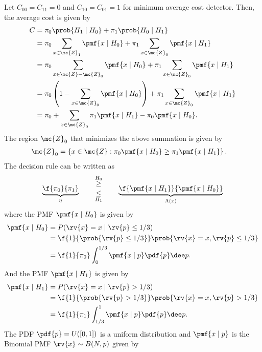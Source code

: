 \begin{example}
    Let $C_{00}=C_{11}=0$ and $C_{10}=C_{01}=1$ for minimum average cost detector. Then, the average cost is given by
    \begin{align}
        C 
        &= \pi_{0}\prob{H_{1}\mid H_{0}} + \pi_{1}\prob{H_{0}\mid H_{1}}\\
        &= \pi_{0}\sum_{x\in\mc{Z}_{1}} \pmf{x\mid H_{0}} + \pi_{1}\sum_{x\in\mc{Z}_{0}}\pmf{x\mid H_{1}}\\
        &= \pi_{0}\sum_{x\in \mc{Z} -  \mc{Z}_{0}} \pmf{x\mid H_{0}} + \pi_{1}\sum_{x\in \mc{Z}_{0}}\pmf{x\mid H_{1}}\\
        &= \pi_{0}\left(1 - \sum_{x\in\mc{Z}_{0}} \pmf{x\mid H_{0}}\right) + \pi_{1}\sum_{x\in \mc{Z}_{0}}\pmf{x\mid H_{1}}\\
        &= \pi_0 + \sum_{x\in\mc{Z}_{0}}\pi_{1}\pmf{x\mid H_{1}} - \pi_{0}\pmf{x\mid H_{0}}.
    \end{align}
    The region $\mc{Z}_{0}$ that minimizes the above summation is given by
    \begin{align}
        \mc{Z}_{0} &= \left\{ 
            x\in\mc{Z} : \pi_{0}\pmf{x\mid H_{0}} \geq \pi_{1}\pmf{x\mid H_{1}}
        \right\}.
    \end{align}
    The decision rule can be written as
    \begin{align}
        \underbrace{\f{\pi_{0}}{\pi_{1}}}_{\eta}\qquad
        {\overset{H_{0}}{\geq}\atop \underset{H_{1}}{\leq}}\qquad
        \underbrace{\f{\pmf{x\mid H_{1}}}{\pmf{x\mid H_{0}}}}_{\Lambda(x)}
    \end{align}
    where the PMF $\pmf{x\mid H_0}$ is given by
    \begin{align}
        \pmf{x \mid H_{0}} 
        &= P(\rv{x}=x \mid \rv{p}\leq 1/3)\\
        &= \f{1}{\prob{\rv{p}\leq 1/3}} \prob{\rv{x}=x, \rv{p}\leq 1/3}\\
        &= \f{1}{\pi_{0}} \int_{0}^{1/3} \pmf{x \mid p}\pdf{p}\dee p.
    \end{align}
    And the PMF $\pmf{x\mid H_{1}}$ is given by
    \begin{align}
        \pmf{x \mid H_{1}} 
        &= P(\rv{x}=x \mid \rv{p}> 1/3)\\
        &= \f{1}{\prob{\rv{p}> 1/3}} \prob{\rv{x}=x, \rv{p}> 1/3}\\
        &= \f{1}{\pi_{1}} \int_{1/3}^{1} \pmf{x \mid p}\pdf{p}\dee p.
    \end{align}
    The PDF $\pdf{p} = U([0,1])$ is a uniform distribution and $\pmf{x\mid p}$ is the Binomial PMF $\rv{x}\sim B(N,p)$ given by

\end{example}
